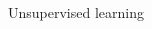 \documentclass[10pt, compress]{beamer}
\begin{document}
\begin{frame}{Unsupervised learning}
\begin{columns}[T]
\begin{column}{0.5\textwidth}
\begin{overlayarea}{\textwidth}{7cm}
\begin{center}
        \end{center}
      \end{overlayarea}
    \end{column}

\end{columns}
\end{frame}
\end{document}

